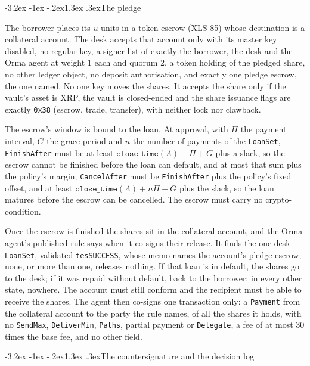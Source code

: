\documentclass[11pt]{article}
\makeatletter
\renewcommand\subsection{\@startsection{subsection}{2}{\z@}%
  {-3.2ex \@plus -1ex \@minus -.2ex}{1.3ex \@plus .3ex}{\normalfont\large\bfseries}}
\theoremstyle{orma}
\theoremstyle{ormaupright}
\makeatother
\begin{document}
\subsection{The pledge}

The borrower places its $u$ units in a token escrow (XLS-85) whose destination is a
collateral account. The desk accepts that account only with its master key disabled, no
regular key, a signer list of exactly the borrower, the desk and the Orma agent at weight
$1$ each and quorum $2$, a token holding of the pledged share, no other ledger object, no
deposit authorisation, and exactly one pledge escrow, the one named. No one key moves the
shares. It accepts the share only if the vault's asset is XRP, the vault is closed-ended and
the share issuance flags are exactly \texttt{0x38} (escrow, trade, transfer), with neither
lock nor clawback.

The escrow's window is bound to the loan. At approval, with $\Pi$ the payment interval, $G$
the grace period and $n$ the number of payments of the \texttt{LoanSet},
\texttt{FinishAfter} must be at least $\texttt{close\_time}(\Lambda) + \Pi + G$ plus a slack,
so the escrow cannot be finished before the loan can default, and at most that sum plus the
policy's margin; \texttt{CancelAfter} must be \texttt{FinishAfter} plus the policy's fixed
offset, and at least $\texttt{close\_time}(\Lambda) + n\Pi + G$ plus the slack, so the loan
matures before the escrow can be cancelled. The escrow must carry no crypto-condition.

Once the escrow is finished the shares sit in the collateral account, and the Orma agent's
published rule says when it co-signs their release. It finds the one desk \texttt{LoanSet},
validated \texttt{tesSUCCESS}, whose memo names the account's pledge escrow; none, or more
than one, releases nothing. If that loan is in default, the shares go to the desk; if it was
repaid without default, back to the borrower; in every other state, nowhere. The account
must still conform and the recipient must be able to receive the shares. The agent then
co-signs one transaction only: a \texttt{Payment} from the collateral account to the party
the rule names, of all the shares it holds, with no \texttt{SendMax}, \texttt{DeliverMin},
\texttt{Paths}, partial payment or \texttt{Delegate}, a fee of at most $30$ times the base
fee, and no other field.

\subsection{The countersignature and the decision log}
\end{document}
